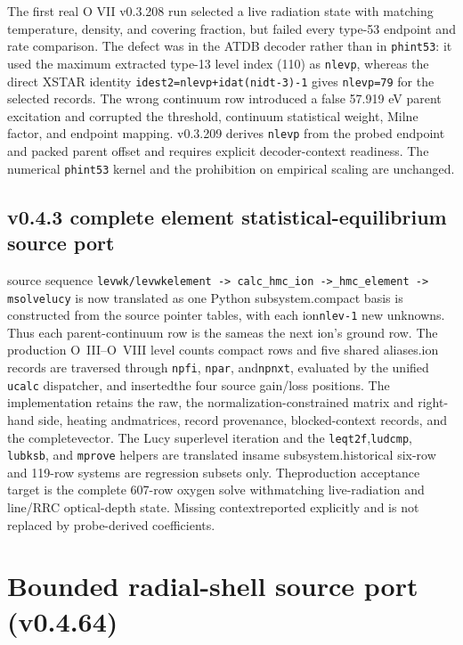 \documentclass[11pt]{article}
\begin{document}
The first real O VII v0.3.208 run selected a live radiation state with matching temperature, density, and covering fraction, but failed every type-53 endpoint and rate comparison. The defect was in the ATDB decoder rather than in \texttt{phint53}: it used the maximum extracted type-13 level index (110) as \texttt{nlevp}, whereas the direct XSTAR identity \texttt{idest2=nlevp+idat(nidt-3)-1} gives \texttt{nlevp=79} for the selected records. The wrong continuum row introduced a false 57.919 eV parent excitation and corrupted the threshold, continuum statistical weight, Milne factor, and endpoint mapping. v0.3.209 derives \texttt{nlevp} from the probed endpoint and packed parent offset and requires explicit decoder-context readiness. The numerical \texttt{phint53} kernel and the prohibition on empirical scaling are unchanged.\n\n\subsection{v0.4.3 complete element statistical-equilibrium source port}\n\nThe source sequence \texttt{levwk/levwkelement -> calc\_hmc\_ion ->\ncalc\_hmc\_element -> msolvelucy} is now translated as one Python subsystem.\nThe compact basis is constructed from the source pointer tables, with each ion\nadding \texttt{nlev-1} new unknowns.  Thus each parent-continuum row is the same\nunknown as the next ion's ground row.  The production O~III--O~VIII level counts compact rows and five shared aliases.\n\nAll ion records are traversed through \texttt{npfi}, \texttt{npar}, and\n\texttt{npnxt}, evaluated by the unified \texttt{ucalc} dispatcher, and inserted\ninto the four source gain/loss positions.  The implementation retains the raw\nmatrix, the normalization-constrained matrix and right-hand side, heating and\ncooling matrices, record provenance, blocked-context records, and the complete\npopulation vector.  The Lucy superlevel iteration and the \texttt{leqt2f},\n\texttt{ludcmp}, \texttt{lubksb}, and \texttt{mprove} helpers are translated in\nthe same subsystem.\n\nThe historical six-row and 119-row systems are regression subsets only.  The\nstrict production acceptance target is the complete 607-row oxygen solve with\nthe matching live-radiation and line/RRC optical-depth state.  Missing context\nis reported explicitly and is not replaced by probe-derived coefficients.\n


\section{Bounded radial-shell source port (v0.4.64)}
\end{document}
